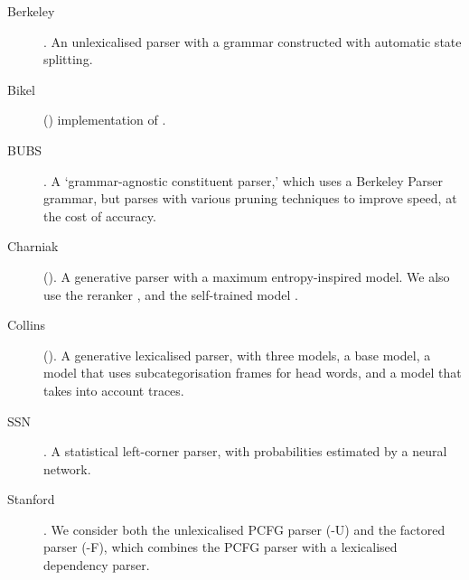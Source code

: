 \begin{description}
	\item[ Berkeley] \parencite{Petrov-etal:2006,Petrov-Klein:2007}. An
	unlexicalised parser with a grammar constructed with automatic state
	splitting.

	\item[ Bikel] (\citeyear{Bikel:2004}) implementation of \textcite{Collins:1997}.

	\item[ BUBS]
	\parencite{Dunlop-Bodenstab-Roark:2011,Bodenstab-Dunlop-Hall-Roark:2011}. A
	`grammar-agnostic constituent parser,' which uses a Berkeley Parser grammar,
	but parses with various pruning techniques to improve speed, at the cost of
	accuracy.

	\item[ Charniak] (\citeyear{Charniak:2000}). A generative parser with a
	maximum entropy-inspired model.  We also use the reranker
	\parencite{Charniak-Johnson:2005}, and the self-trained model
	\parencite{McClosky-Charniak-Johnson:2006}.

	\item[ Collins] (\citeyear{Collins:1997}). A generative lexicalised parser, with
	three models, a base model, a model that uses subcategorisation
	frames for head words, and a model that takes into account traces.

	\item[ SSN] \parencite{Henderson:2003,Henderson:2004}. A statistical left-corner
	parser, with probabilities estimated by a neural network.

	\item[ Stanford] \parencite{Klein-Manning:2003:ACL,Klein-Manning:2003:NIPS}. We
	consider both the unlexicalised PCFG parser (-U) and the factored parser
	(-F), which combines the PCFG parser with a lexicalised dependency parser.
\end{description}

